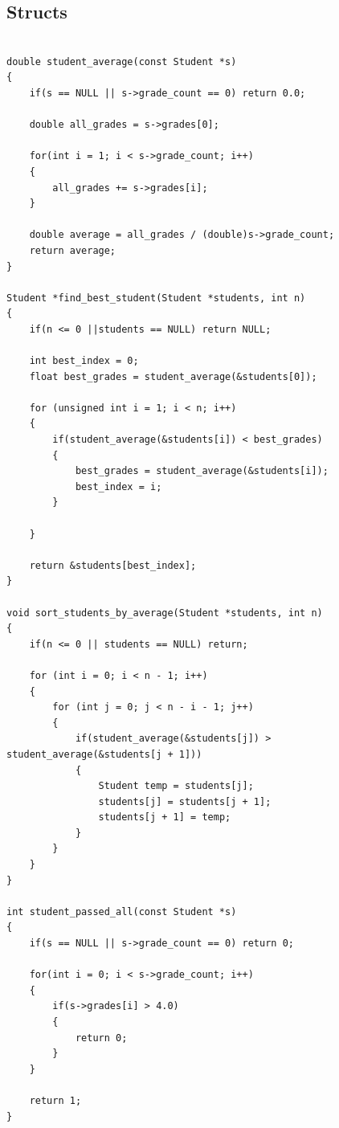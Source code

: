 \documentclass[10pt, a4paper]{article}
\begin{document}
\subsection{Structs}
\begin{lstlisting}

double student_average(const Student *s) 
{
    if(s == NULL || s->grade_count == 0) return 0.0;
    
    double all_grades = s->grades[0];

    for(int i = 1; i < s->grade_count; i++)
    {
        all_grades += s->grades[i];
    }

    double average = all_grades / (double)s->grade_count;
    return average;
}

Student *find_best_student(Student *students, int n) 
{
    if(n <= 0 ||students == NULL) return NULL;
    
    int best_index = 0;
    float best_grades = student_average(&students[0]);

    for (unsigned int i = 1; i < n; i++)
    {
        if(student_average(&students[i]) < best_grades)
        {
            best_grades = student_average(&students[i]);
            best_index = i;
        }
        
    }
    
    return &students[best_index];
}

void sort_students_by_average(Student *students, int n) 
{
    if(n <= 0 || students == NULL) return;

    for (int i = 0; i < n - 1; i++) 
    {
        for (int j = 0; j < n - i - 1; j++) 
        {
            if(student_average(&students[j]) > student_average(&students[j + 1]))
            {
                Student temp = students[j];
                students[j] = students[j + 1];
                students[j + 1] = temp; 
            }
        }
    }
}

int student_passed_all(const Student *s) 
{
    if(s == NULL || s->grade_count == 0) return 0;

    for(int i = 0; i < s->grade_count; i++)
    {
        if(s->grades[i] > 4.0)
        {        
            return 0;
        }
    }
    
    return 1;
}

\end{lstlisting}
\end{document}

